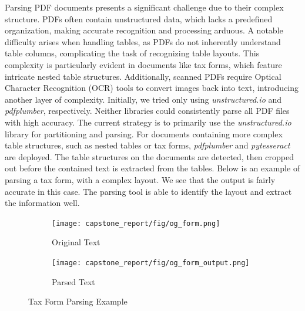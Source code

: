 \documentclass{scrartcl}
\begin{document}
Parsing PDF documents presents a significant challenge due to their complex structure. PDFs often contain unstructured data, which lacks a predefined organization, making accurate recognition and processing arduous. A notable difficulty arises when handling tables, as PDFs do not inherently understand table columns, complicating the task of recognizing table layouts. This complexity is particularly evident in documents like tax forms, which feature intricate nested table structures. Additionally, scanned PDFs require Optical Character Recognition (OCR) tools to convert images back into text, introducing another layer of complexity.
\newline
\newline
Initially, we tried only using \textit{unstructured.io}\cite{unstrio} and \textit{pdfplumber}\cite{pdfplumber}, respectively. Neither libraries could consistently parse all PDF files with high accuracy.
The current strategy is to primarily use the \textit{unstructured.io} library for partitioning and parsing.
For documents containing more complex table structures, such as nested tables or tax forms, \textit{pdfplumber} and \textit{pytesseract}\cite{pytesseract} are deployed.
The table structures on the documents are detected, then cropped out before the contained text is extracted from the tables.
\newline
\newpage
Below is an example of parsing a tax form, with a complex layout. We see that the output is fairly accurate in this case. The parsing tool is able to identify the layout and extract the information well.
\newline
\newline
\begin{figure}[h!]
    \centering
    \begin{subfigure}[b]{\textwidth}
        \texttt{[image: capstone\_report/fig/og\_form.png]}
        \caption{Original Text}
        \label{fig:image1}
    \end{subfigure}

    \begin{subfigure}[b]{\textwidth}
        \texttt{[image: capstone\_report/fig/og\_form\_output.png]}
        \caption{Parsed Text}
        \label{fig:image2}
    \end{subfigure}
    \caption{Tax Form Parsing Example}
    \label{fig:images}
\end{figure}

\newline
\newline
\end{document}
